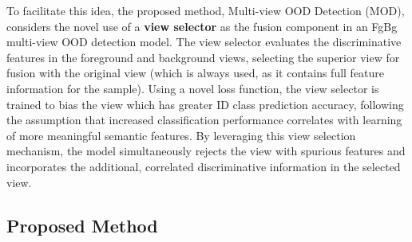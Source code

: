 To facilitate this idea, the proposed method, %
Multi-view OOD Detection (MOD), considers the novel use of a \textbf{view selector} as the fusion component in an FgBg multi-view OOD detection model. The view selector evaluates the discriminative features in the foreground and background views, selecting the superior view for fusion with the original view (which is always used, as it contains full feature information for the sample). Using a novel loss function, the view selector is trained to bias the view which has greater ID class prediction accuracy, following the assumption that increased classification performance correlates with learning of more meaningful semantic features. By leveraging this view selection mechanism, the model simultaneously rejects the view with spurious features and incorporates the additional, correlated discriminative information in the selected view.

\subsection{Proposed Method}
\label{sec:propwork-mod-propmeth}


